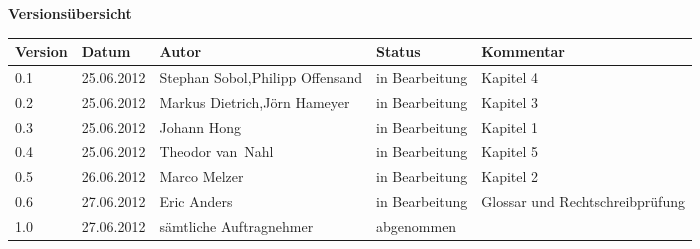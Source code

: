 
{\textbf{Versionsübersicht}}\\[2ex]

\begin{longtable}{|m{1.78cm}|m{1.59cm}|m{3.5cm}|m{2.1cm}|m{3.0cm}|}

  \hline                                              %

  \textbf{Version}  &    \textbf{Datum}  &    \textbf{Autor}  &
  \textbf{Status}   &    \textbf{Kommentar}       \\  %
  \hline                                              %


  0.1    &    25.06.2012    &    Stephan Sobol,\newline Philipp \mbox{Offensand}    &    
  in Bearbeitung    &  Kapitel 4   \\      %
  \hline                                                     %
  0.2    &    25.06.2012    &    Markus Dietrich,\newline Jörn Hameyer    &    
  in Bearbeitung    &    Kapitel 3\\      %
  \hline                            %
  0.3    &    25.06.2012    &    Johann Hong    &    
  in Bearbeitung    &    Kapitel 1\\      %
  \hline                                                     %
  0.4    &    25.06.2012    &    Theodor \mbox{van Nahl}    &    
  in Bearbeitung    &    Kapitel 5\\      %
  \hline                                                     %
  0.5    &    26.06.2012    &    Marco Melzer    &    
  in Bearbeitung    &    Kapitel 2\\      %
  \hline                                                     %
  0.6    &    27.06.2012    &    Eric Anders    &    
  in Bearbeitung    &    Glossar und Rechtschreibprüfung\\      %
  \hline                                                     %
  1.0    &    27.06.2012    &    sämtliche Auftragnehmer    &    
  abgenommen    &    \\      %
  \hline                                                     %
  
  

\end{longtable}

